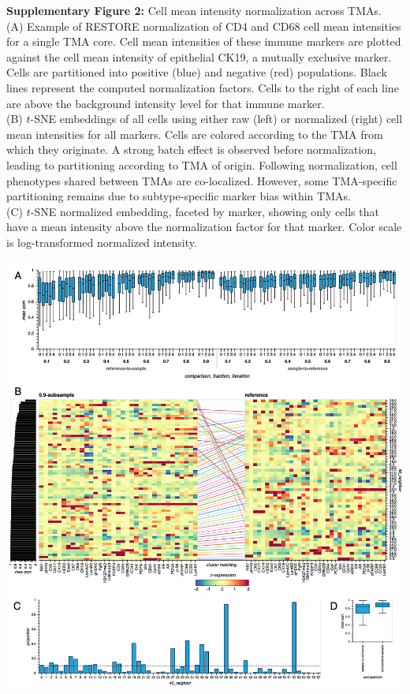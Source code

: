 \documentclass[preprint,review,3p,12pt]{elsarticle}
\begin{document}
\noindent
\textbf{Supplementary Figure 2:} Cell mean intensity normalization across TMAs.\\
(A) Example of RESTORE normalization \cite{Chang2020} of CD4 and CD68 cell mean intensities for a single TMA core. Cell mean intensities of these immune markers are plotted against the cell mean intensity of epithelial CK19, a mutually exclusive marker. Cells are partitioned into positive (blue) and negative (red) populations. Black lines represent the computed normalization factors. Cells to the right of each line are above the background intensity level for that immune marker.\\
(B) $t$-SNE embeddings of all cells using either raw (left) or normalized (right) cell mean intensities for all markers. Cells are colored according to the TMA from which they originate. A strong batch effect is observed before normalization, leading to partitioning according to TMA of origin. Following normalization, cell phenotypes shared between TMAs are co-localized. However, some TMA-specific partitioning remains due to subtype-specific marker bias within TMAs.\\
(C) $t$-SNE normalized embedding, faceted by marker, showing only cells that have a mean intensity above the normalization factor for that marker. Color scale is log-transformed normalized intensity.

\begin{suppfigure}[p]
\centering\includegraphics[width=\linewidth,
                 keepaspectratio]{suppfig3_secondrevision}
\caption{}
\label{fig:suppfig3}
\end{suppfigure}
\end{document}
